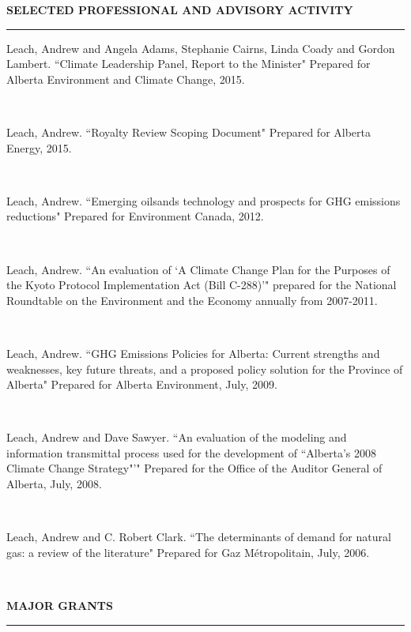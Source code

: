 \documentclass{article}[12pt]
\newcommand{\negind}{\hspace*{-15pt}}
\newcommand{\inprogress}[3]{\parbox[b]{.93\textwidth}{\negind #1. ``#2" #3  }
\\[-.65ex] \hfill}
\newcommand{\justlist}[1]{\negind #1 \smallskip}
\begin{document}
\noindent \textbf{{\large SELECTED PROFESSIONAL AND ADVISORY ACTIVITY}}


\medskip
{\large\scshape\hrule\vspace{0.8\baselineskip}} %
\smallskip %


\inprogress{Leach, Andrew and Angela Adams, Stephanie Cairns, Linda Coady and Gordon Lambert}{Climate Leadership Panel, Report to the Minister}{Prepared for Alberta Environment and Climate Change, 2015.}

\inprogress{Leach, Andrew}{Royalty Review Scoping Document}{Prepared for Alberta Energy, 2015.}

\inprogress{Leach, Andrew}{Emerging oilsands technology and prospects for GHG
	emissions reductions}{Prepared for Environment Canada, 2012.}

\inprogress{Leach, Andrew}{An evaluation of `A Climate Change Plan for the
Purposes of the Kyoto Protocol Implementation Act (Bill C-288)'}{prepared for
the National Roundtable on the Environment and the Economy annually from
2007-2011.}

\inprogress{Leach, Andrew}{GHG Emissions Policies for Alberta: Current
strengths and weaknesses, key future threats, and a proposed policy solution
for the Province of Alberta}{Prepared for Alberta Environment, July, 2009.}

\inprogress{Leach, Andrew and Dave Sawyer}{An evaluation of the modeling and
information transmittal process used for the development of ``Alberta's 2008
Climate Change Strategy"'}{Prepared for the Office of the Auditor General of
Alberta, July, 2008.}

\inprogress{Leach, Andrew and C. Robert Clark}{The determinants of demand for
natural gas: a review of the literature}{Prepared for Gaz M\'{e}tropolitain,
July, 2006.}


\medskip

\noindent \textbf{{\large MAJOR GRANTS}}

\medskip
{\large\scshape\hrule\vspace{0.8\baselineskip}} %
\medskip                                                            %
\end{document}
